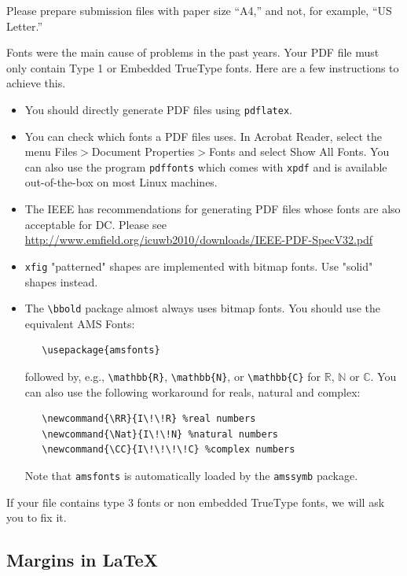 \documentclass[11pt,a4paper]{article}
\begin{document}
Please prepare submission files with paper size ``A4,'' and not, for
example, ``US Letter.''

Fonts were the main cause of problems in the past years. Your PDF file must only
contain Type 1 or Embedded TrueType fonts. Here are a few instructions to
achieve this.

\begin{itemize}

\item You should directly generate PDF files using \verb+pdflatex+.

\item You can check which fonts a PDF files uses.  In Acrobat Reader, select the
  menu Files$>$Document Properties$>$Fonts and select Show All Fonts. You can
  also use the program \verb+pdffonts+ which comes with \verb+xpdf+ and is
  available out-of-the-box on most Linux machines.

\item The IEEE has recommendations for generating PDF files whose fonts are also
  acceptable for DC. Please see
  \url{http://www.emfield.org/icuwb2010/downloads/IEEE-PDF-SpecV32.pdf}

\item \verb+xfig+ "patterned" shapes are implemented with bitmap fonts.  Use
  "solid" shapes instead.

\item The \verb+\bbold+ package almost always uses bitmap fonts.  You should use
  the equivalent AMS Fonts:
\begin{verbatim}
   \usepackage{amsfonts}
\end{verbatim}
followed by, e.g., \verb+\mathbb{R}+, \verb+\mathbb{N}+, or \verb+\mathbb{C}+
for $\mathbb{R}$, $\mathbb{N}$ or $\mathbb{C}$.  You can also use the following
workaround for reals, natural and complex:
\begin{verbatim}
   \newcommand{\RR}{I\!\!R} %real numbers
   \newcommand{\Nat}{I\!\!N} %natural numbers
   \newcommand{\CC}{I\!\!\!\!C} %complex numbers
\end{verbatim}
Note that \verb+amsfonts+ is automatically loaded by the \verb+amssymb+ package.

\end{itemize}

If your file contains type 3 fonts or non embedded TrueType fonts, we will ask
you to fix it.

\subsection{Margins in \LaTeX{}}
\end{document}
